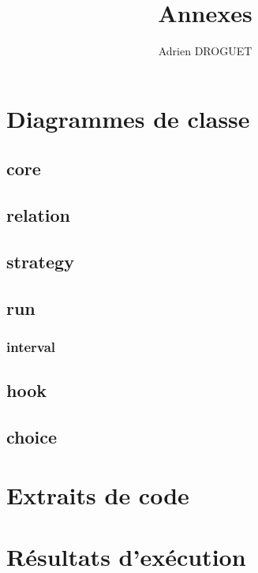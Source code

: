 \documentclass[a4paper,10pt]{report}
\title{Annexes}
\author{Adrien DROGUET}
\begin{document}
\maketitle

\tableofcontents
\pagebreak

\chapter{Diagrammes de classe}

\section{core}

\section{relation}

\section{strategy}

\section{run}

\subsection{interval}

\section{hook}

\section{choice}

\chapter{Extraits de code}

\chapter{Résultats d'exécution}
\end{document}
